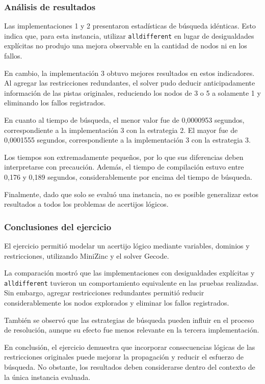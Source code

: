 \subsubsection{Análisis de resultados}

Las implementaciones 1 y 2 presentaron estadísticas de búsqueda idénticas. Esto indica que, para esta instancia, utilizar \texttt{alldifferent} en lugar de desigualdades explícitas no produjo una mejora observable en la cantidad de nodos ni en los fallos.

En cambio, la implementación 3 obtuvo mejores resultados en estos indicadores. Al agregar las restricciones redundantes, el solver pudo deducir anticipadamente información de las pistas originales, reduciendo los nodos de 3 o 5 a solamente 1 y eliminando los fallos registrados.

En cuanto al tiempo de búsqueda, el menor valor fue de 0,0000953 segundos, correspondiente a la implementación 3 con la estrategia 2. El mayor fue de 0,0001555 segundos, correspondiente a la implementación 3 con la estrategia 3.

Los tiempos son extremadamente pequeños, por lo que sus diferencias deben interpretarse con precaución. Además, el tiempo de compilación estuvo entre 0,176 y 0,189 segundos, considerablemente por encima del tiempo de búsqueda.

Finalmente, dado que solo se evaluó una instancia, no es posible generalizar estos resultados a todos los problemas de acertijos lógicos.

\subsubsection{Conclusiones del ejercicio}

El ejercicio permitió modelar un acertijo lógico mediante variables, dominios y restricciones, utilizando MiniZinc y el solver Gecode.

La comparación mostró que las implementaciones con desigualdades explícitas y \texttt{alldifferent} tuvieron un comportamiento equivalente en las pruebas realizadas. Sin embargo, agregar restricciones redundantes permitió reducir considerablemente los nodos explorados y eliminar los fallos registrados.

También se observó que las estrategias de búsqueda pueden influir en el proceso de resolución, aunque su efecto fue menos relevante en la tercera implementación.

En conclusión, el ejercicio demuestra que incorporar consecuencias lógicas de las restricciones originales puede mejorar la propagación y reducir el esfuerzo de búsqueda. No obstante, los resultados deben considerarse dentro del contexto de la única instancia evaluada.
